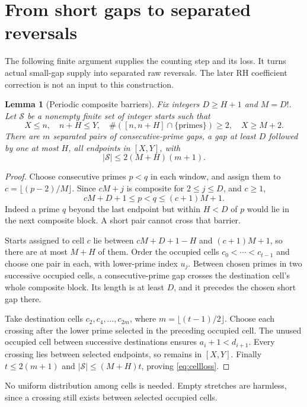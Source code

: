 \documentclass[11pt]{article}
\newtheorem{lemma}[theorem]{Lemma}
\theoremstyle{definition}
\begin{document}
\section{From short gaps to separated reversals}\label{sec:selection}
The following finite argument supplies the counting step and its loss.
It turns actual small-gap supply into separated raw reversals.
The later RH coefficient correction is not an input to this construction.

\begin{lemma}[Periodic composite barriers]\label{lem:cells}
Fix integers $D\ge H+1$ and $M=D!$. Let $\mathcal S$ be a
nonempty finite set of integer starts such that
\[
 X\le n,\quad n+H\le Y,\quad
 \#([n,n+H]\cap\{\text{primes}\})\ge2,\quad X\ge M+2.
\]
There are $m$ separated pairs of consecutive-prime gaps, a gap at
least $D$ followed by one at most $H$, all endpoints in $[X,Y]$,
with
\begin{equation}\label{eq:cellloss}
 |\mathcal S|\le2(M+H)(m+1).
\end{equation}
\end{lemma}
\begin{proof}
Choose consecutive primes $p<q$ in each window, and assign them
to $c=\lfloor(p-2)/M\rfloor$. Since $cM+j$ is composite for
$2\le j\le D$, and $c\ge1$,
\[
 cM+D+1\le p<q\le(c+1)M+1.
\]
Indeed a prime $q$ beyond the last endpoint but within $H<D$
of $p$ would lie in the next composite block. A short pair cannot
cross that barrier.

Starts assigned to cell $c$ lie between $cM+D+1-H$ and
$(c+1)M+1$, so there are at most $M+H$ of them.
Order the occupied cells $c_0<\cdots<c_{t-1}$ and choose one
pair in each, with lower-prime index $u_j$. Between chosen
primes in two successive occupied cells, a consecutive-prime gap
crosses the destination cell's whole composite block. Its length
is at least $D$, and it precedes the chosen short gap there.

Take destination cells $c_2,c_4,\ldots,c_{2m}$, where
$m=\lfloor(t-1)/2\rfloor$. Choose each crossing after the lower
prime selected in the preceding occupied cell. The unused occupied
cell between successive destinations ensures $a_i+1<d_{i+1}$.
Every crossing lies between selected endpoints, so remains in
$[X,Y]$. Finally $t\le2(m+1)$ and
$|\mathcal S|\le(M+H)t$, proving \eqref{eq:cellloss}.
\end{proof}
No uniform distribution among cells is needed. Empty stretches
are harmless, since a crossing still exists between selected
occupied cells.
\end{document}
